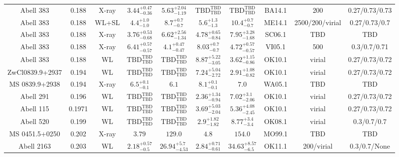 \begin{table}
\begin{tabular}{cccccccccc}
Abell 383 & 0.188 & X-ray & ${3.44}^{+0.47}_{-0.36}$ & ${5.63}^{+2.04}_{-1.19}$ & ${\mathrm{TBD}}^{\mathrm{TBD}}_{\mathrm{TBD}}$ & ${\mathrm{TBD}}^{\mathrm{TBD}}_{\mathrm{TBD}}$ & BA14.1 & 200 & 0.27/0.73/0.73 \\
Abell 383 & 0.188 & WL+SL & ${4.4}^{+1.0}_{-1.0}$ & ${8.7}^{+0.7}_{-0.7}$ & ${5.6}^{+1.3}_{-1.3}$ & ${10.4}^{+0.7}_{-0.7}$ & ME14.1 & 2500/200/virial & 0.27/0.73/0.7 \\
Abell 383 & 0.188 & X-ray & ${3.76}^{+0.53}_{-0.68}$ & ${6.62}^{+2.56}_{-1.34}$ & ${4.78}^{+0.65}_{-0.84}$ & ${7.95}^{+3.28}_{-1.68}$ & SC06.1 & TBD & TBD \\
Abell 383 & 0.188 & X-ray & ${6.41}^{+0.57}_{-0.57}$ & ${4.1}^{+0.47}_{-0.47}$ & ${8.03}^{+0.7}_{-0.7}$ & ${4.72}^{+0.57}_{-0.57}$ & VI05.1 & 500 & 0.3/0.7/0.71 \\
Abell 383 & 0.188 & WL & ${\mathrm{TBD}}^{\mathrm{TBD}}_{\mathrm{TBD}}$ & ${\mathrm{TBD}}^{\mathrm{TBD}}_{\mathrm{TBD}}$ & ${8.87}^{+5.22}_{-3.05}$ & ${3.62}^{+1.15}_{-0.86}$ & OK10.1 & virial & 0.27/0.73/0.72 \\
ZwCl0839.9+2937 & 0.194 & WL & ${\mathrm{TBD}}^{\mathrm{TBD}}_{\mathrm{TBD}}$ & ${\mathrm{TBD}}^{\mathrm{TBD}}_{\mathrm{TBD}}$ & ${7.24}^{+5.04}_{-2.72}$ & ${2.91}^{+1.08}_{-0.82}$ & OK10.1 & virial & 0.27/0.73/0.72 \\
MS 0839.9+2938 & 0.194 & X-ray & ${6.5}^{+0.1}_{-0.1}$ & ${6.1}^{}_{}$ & ${8.1}^{+0.1}_{-0.1}$ & ${7.0}^{}_{}$ & WA05.1 & TBD & TBD \\
Abell 291 & 0.196 & WL & ${\mathrm{TBD}}^{\mathrm{TBD}}_{\mathrm{TBD}}$ & ${\mathrm{TBD}}^{\mathrm{TBD}}_{\mathrm{TBD}}$ & ${2.36}^{+1.34}_{-0.94}$ & ${7.02}^{+3.1}_{-2.06}$ & OK10.1 & virial & 0.27/0.73/0.72 \\
Abell 115 & 0.1971 & WL & ${\mathrm{TBD}}^{\mathrm{TBD}}_{\mathrm{TBD}}$ & ${\mathrm{TBD}}^{\mathrm{TBD}}_{\mathrm{TBD}}$ & ${3.69}^{+5.03}_{-2.04}$ & ${5.36}^{+4.08}_{-2.45}$ & OK10.1 & virial & 0.27/0.73/0.72 \\
Abell 520 & 0.199 & WL & ${\mathrm{TBD}}^{\mathrm{TBD}}_{\mathrm{TBD}}$ & ${\mathrm{TBD}}^{\mathrm{TBD}}_{\mathrm{TBD}}$ & ${2.9}^{+1.82}_{-1.82}$ & ${8.77}^{+3.4}_{-3.4}$ & OK08.1 & virial & 0.3/0.7/0.7 \\
MS 0451.5+0250 & 0.202 & X-ray & ${3.79}^{}_{}$ & ${129.0}^{}_{}$ & ${4.8}^{}_{}$ & ${154.0}^{}_{}$ & MO99.1 & TBD & TBD \\
Abell 2163 & 0.203 & WL & ${2.18}^{+0.57}_{-0.5}$ & ${26.94}^{+5.7}_{-4.53}$ & ${2.84}^{+0.71}_{-0.61}$ & ${34.63}^{+8.57}_{-6.5}$ & OK11.1 & 200/virial & 0.3/0.7/None \\

\end{tabular}
\end{table}
